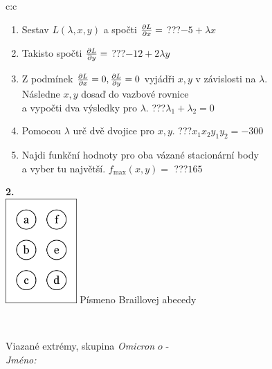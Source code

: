 \documentclass[10pt]{report}
\newcommand\omicron{o}
\begin{document}
\begin{tabular}{c:c}
\begin{minipage}[c][104.5mm][t]{0.5\linewidth}
\begin{center}
\begin{minipage}{0.79\linewidth}
\begin{center}
\begin{varwidth}{\linewidth}
\begin{enumerate}
\item Sestav $L(\lambda,x,y)$ a spočti $\pdv{L}{x}=$\quad \dotfill\; ???\;\dotfill \quad $-5+\lambda x$
\item Takisto spočti $\pdv{L}{y}=$\quad \dotfill\; ???\;\dotfill \quad $-12+2\lambda y$
\item Z podmínek $\pdv{L}{x}=0 , \pdv{L}{y}=0$ vyjádři $x,y$ v závislosti na $\lambda$.\\ \phantom{xxxxxx}Následne $x,y$ dosaď do vazbové rovnice\\ \phantom{xxxxxx}a vypočti dva výsledky pro $\lambda$.\quad \dotfill\; ???\;\dotfill \quad $\lambda_1+\lambda_2=0$
\item Pomocou $\lambda$ urč dvě dvojice pro $x,y$.\quad \dotfill\; ???\;\dotfill \quad $x_1 x_2 y_1 y_2=-300$
\item Najdi funkční hodnoty pro oba vázané stacionární body\\ \phantom{xxxxxx}a vyber tu najvětší. $f_{\text{max}}(x,y)=$\quad \dotfill\; ???\;\dotfill \quad $165$
\end{enumerate}
\end{varwidth}
\end{center}
\end{minipage}
\begin{minipage}{0.20\linewidth}
\begin{center}
{\Huge\bfseries 2.} \\[2mm]
\includegraphics[height=40mm]{../images/braille.png}
{\small Písmeno Braillovej abecedy}
\end{center}
\end{minipage}
\end{center}
\end{minipage}
\\ \hdashline
\begin{minipage}[c][104.5mm][t]{0.5\linewidth}
\begin{center}
\vspace{7mm}
{\huge Viazané extrémy, skupina \textit{Omicron $\omicron$} -}\\[5mm]
\textit{Jméno:}\phantom{xxxxxxxxxxxxxxxxxxxxxxxxxxxxxxxxxxxxxxxxxxxxxxxxxxxxxxxxxxxxxxxxx}\\[5mm]

\end{center}
\end{minipage}
\end{tabular}
\end{document}
